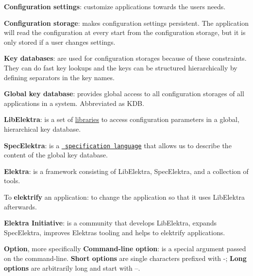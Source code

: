 
\begin{DoxyItemize}
\item {\bfseries{Configuration settings}}\+: customize applications towards the users needs.
\item {\bfseries{Configuration storage}}\+: makes configuration settings persistent. The application will read the configuration at every start from the configuration storage, but it is only stored if a user changes settings.
\item {\bfseries{Key databases}}\+: are used for configuration storages because of these constraints. They can do fast key lookups and the keys can be structured hierarchically by defining separators in the key names.
\item {\bfseries{Global key database}}\+: provides global access to all configuration storages of all applications in a system. Abbreviated as {\ttfamily K\+DB}.
\item {\bfseries{Lib\+Elektra}}\+: is a set of \mbox{\hyperlink{src_libs_README_md}{libraries}} to access configuration parameters in a global, hierarchical key database.
\item {\bfseries{Spec\+Elektra}}\+: is a \href{/home/mpranj/workspace/libelektra/doc/METADATA.ini}{\texttt{ specification language}} that allows us to describe the content of the global key database.
\item {\bfseries{Elektra}}\+: is a framework consisting of Lib\+Elektra, Spec\+Elektra, and a collection of tools.
\item To {\bfseries{elektrify}} an application\+: to change the application so that it uses Lib\+Elektra afterwards.
\item {\bfseries{Elektra Initiative}}\+: is a community that develops Lib\+Elektra, expands Spec\+Elektra, improves Elektra\textquotesingle{}s tooling and helps to elektrify applications.
\item {\bfseries{Option}}, more specifically {\bfseries{Command-\/line option}}\+: is a special argument passed on the command-\/line. {\bfseries{Short options}} are single characters prefixed with \textquotesingle{}-\/\textquotesingle{}; {\bfseries{Long options}} are arbitrarily long and start with \textquotesingle{}--\textquotesingle{}.
\end{DoxyItemize}


